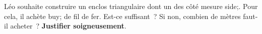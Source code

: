 \documentclass[exercice]{thedocument}%
\begin{document}
%
Léo souhaite construire un enclos triangulaire dont un des côté mesure \<side;. Pour cela, il achète
\<buy; de fil de fer. Est-ce suffisant~? Si non, combien de mètres faut-il acheter~? {\bfseries Justifier soigneusement}.
\end{document}
